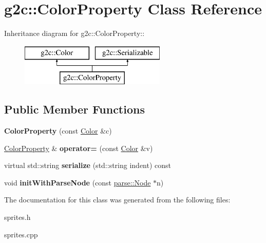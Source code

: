 \hypertarget{classg2c_1_1_color_property}{
\section{g2c::ColorProperty Class Reference}
\label{classg2c_1_1_color_property}
}
Inheritance diagram for g2c::ColorProperty::\begin{figure}[H]
\begin{center}
\leavevmode
\includegraphics[height=2cm]{classg2c_1_1_color_property}
\end{center}
\end{figure}
\subsection*{Public Member Functions}
\begin{DoxyCompactItemize}
\item 
\hypertarget{classg2c_1_1_color_property_a0342ab7b0cb34333e74bf597fe18472d}{
{\bfseries ColorProperty} (const \hyperlink{classg2c_1_1_color}{Color} \&c)}
\label{classg2c_1_1_color_property_a0342ab7b0cb34333e74bf597fe18472d}

\item 
\hypertarget{classg2c_1_1_color_property_a17c8597e111e9d1da1d27d563312f220}{
\hyperlink{classg2c_1_1_color_property}{ColorProperty} \& {\bfseries operator=} (const \hyperlink{classg2c_1_1_color}{Color} \&v)}
\label{classg2c_1_1_color_property_a17c8597e111e9d1da1d27d563312f220}

\item 
\hypertarget{classg2c_1_1_color_property_aef34a6c20e5767e16d95f713013bd4a0}{
virtual std::string {\bfseries serialize} (std::string indent) const }
\label{classg2c_1_1_color_property_aef34a6c20e5767e16d95f713013bd4a0}

\item 
\hypertarget{classg2c_1_1_color_property_aeef6cc3b62b9ddca119280f3cccf7055}{
void {\bfseries initWithParseNode} (const \hyperlink{classparse_1_1_node}{parse::Node} $\ast$n)}
\label{classg2c_1_1_color_property_aeef6cc3b62b9ddca119280f3cccf7055}

\end{DoxyCompactItemize}


The documentation for this class was generated from the following files:\begin{DoxyCompactItemize}
\item 
sprites.h\item 
sprites.cpp\end{DoxyCompactItemize}
